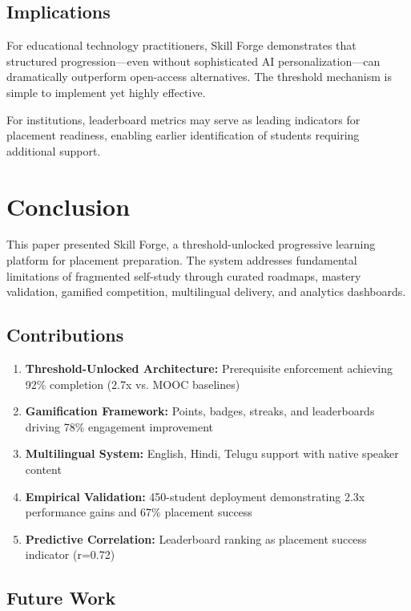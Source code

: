 \documentclass[journal]{IEEEtran}
\begin{document}
\subsection{Implications}

For educational technology practitioners, Skill Forge demonstrates that structured progression---even without sophisticated AI personalization---can dramatically outperform open-access alternatives. The threshold mechanism is simple to implement yet highly effective.

For institutions, leaderboard metrics may serve as leading indicators for placement readiness, enabling earlier identification of students requiring additional support.

\section{Conclusion}
\label{sec:conclusion}

This paper presented Skill Forge, a threshold-unlocked progressive learning platform for placement preparation. The system addresses fundamental limitations of fragmented self-study through curated roadmaps, mastery validation, gamified competition, multilingual delivery, and analytics dashboards.

\subsection{Contributions}

\begin{enumerate}
    \item \textbf{Threshold-Unlocked Architecture:} Prerequisite enforcement achieving 92\% completion (2.7x vs. MOOC baselines)
    \item \textbf{Gamification Framework:} Points, badges, streaks, and leaderboards driving 78\% engagement improvement
    \item \textbf{Multilingual System:} English, Hindi, Telugu support with native speaker content
    \item \textbf{Empirical Validation:} 450-student deployment demonstrating 2.3x performance gains and 67\% placement success
    \item \textbf{Predictive Correlation:} Leaderboard ranking as placement success indicator (r=0.72)
\end{enumerate}

\subsection{Future Work}
\end{document}
